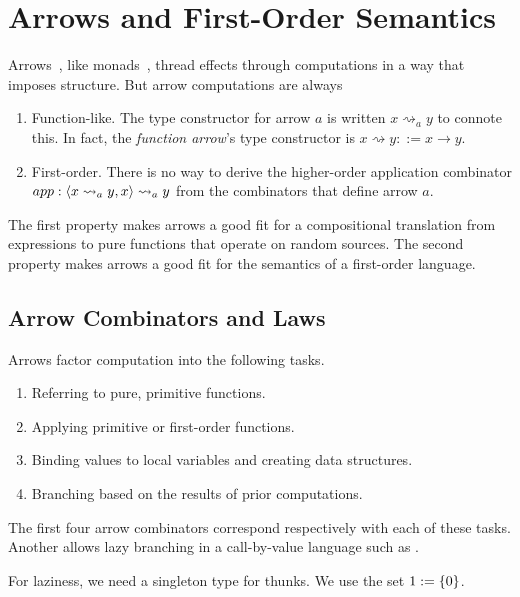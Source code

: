 \documentclass{llncs}
\newcommand{\arrow}{\rightsquigarrow}
\newcommand{\apair}{\ensuremath{\mathit{\&\mspace{-7.5mu}\&\mspace{-7.5mu}\&}}}
\begin{document}
\section{Arrows and First-Order Semantics}
\label{sec:arrows}

Arrows~\cite{cit:hughes-2000scp-arrows}, like monads~\cite{cit:wadler-2001-monads}, thread effects through computations in a way that imposes structure.
But arrow computations are always
\begin{enumerate}
	\item Function-like. The type constructor for arrow $a$ is written $x \arrow_a y$ to connote this. In fact, the \emph{function arrow}'s type constructor is $x \arrow y ::= x \to y$.
	\item First-order. There is no way to derive the higher-order application combinator $app : \pair{x \arrow_a y, x} \arrow_a y$ from the combinators that define arrow $a$.
\end{enumerate}
The first property makes arrows a good fit for a compositional translation from expressions to pure functions that operate on random sources.
The second property makes arrows a good fit for the semantics of a first-order language.

\subsection{Arrow Combinators and Laws}
\label{sec:arrow-definitions}

Arrows factor computation into the following tasks.
\begin{enumerate}
	\item Referring to pure, primitive functions.
	\item Applying primitive or first-order functions.
	\item Binding values to local variables and creating data structures.
	\item Branching based on the results of prior computations.
\end{enumerate}
The first four arrow combinators correspond respectively with each of these tasks.
Another allows lazy branching in a call-by-value language such as \lzfclang.

For laziness, we need a singleton type for thunks.
We use the set $1 := \{{0}\}$.

\newcommand{\arrowfootnote}{\footnote{These are actually arrows \emph{with choice}, which are typically defined using $first_a$ and $left_a$ instead of $(\apair_a)$ and $ifte_a$.
We find $ifte_a$ more natural for semantics than $left_a$, and $(\apair_a)$ better matches the pairing preimage identity in~\eqref{eqn:preimage-identities}.}\xspace}
\end{document}
